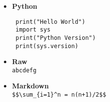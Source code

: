 \begin{itemize}
\item \textbf{Python} \\
\begin{lstlisting}
 print("Hello World")
 import sys
 print("Python Version")
 print(sys.version)
\end{lstlisting}

\item \textbf{Raw} \\
\verb|abcdefg|

\item \textbf{Markdown} \\
\verb|$$\sum_{i=1}^n = n(n+1)/2$$|
\end{itemize}
